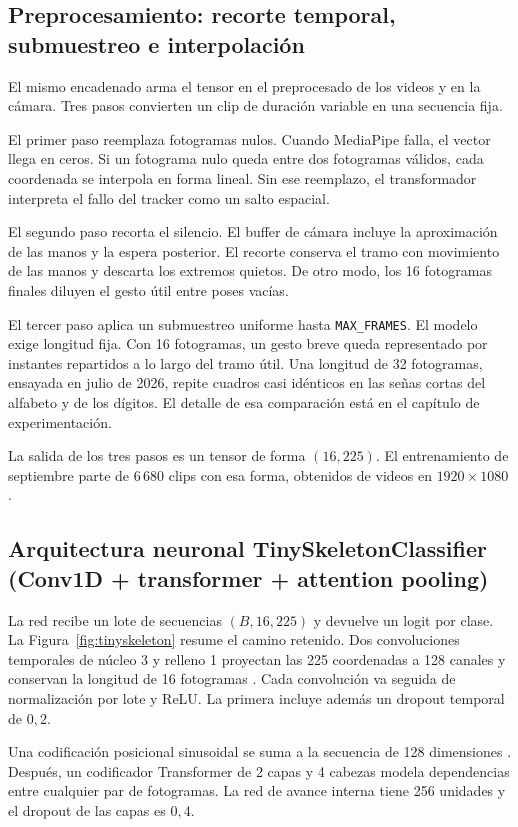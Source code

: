 \subsection{Preprocesamiento: recorte temporal, submuestreo e interpolación}

El mismo encadenado arma el tensor en el preprocesado de los videos y en la cámara. Tres pasos convierten un clip de duración variable en una secuencia fija.

El primer paso reemplaza fotogramas nulos. Cuando MediaPipe falla, el vector llega en ceros. Si un fotograma nulo queda entre dos fotogramas válidos, cada coordenada se interpola en forma lineal. Sin ese reemplazo, el transformador interpreta el fallo del tracker como un salto espacial.

El segundo paso recorta el silencio. El buffer de cámara incluye la aproximación de las manos y la espera posterior. El recorte conserva el tramo con movimiento de las manos y descarta los extremos quietos. De otro modo, los 16 fotogramas finales diluyen el gesto útil entre poses vacías.

El tercer paso aplica un submuestreo uniforme hasta \texttt{MAX\_FRAMES}. El modelo exige longitud fija. Con 16 fotogramas, un gesto breve queda representado por instantes repartidos a lo largo del tramo útil. Una longitud de 32 fotogramas, ensayada en julio de 2026, repite cuadros casi idénticos en las señas cortas del alfabeto y de los dígitos. El detalle de esa comparación está en el capítulo de experimentación.

La salida de los tres pasos es un tensor de forma $(16, 225)$. El entrenamiento de septiembre parte de 6\,680 clips con esa forma, obtenidos de videos en $1920 \times 1080$.

\subsection{Arquitectura neuronal TinySkeletonClassifier (Conv1D + transformer + attention pooling)}

La red recibe un lote de secuencias $(B, 16, 225)$ y devuelve un logit por clase. La Figura~\ref{fig:tinyskeleton} resume el camino retenido. Dos convoluciones temporales de núcleo 3 y relleno 1 proyectan las 225 coordenadas a 128 canales y conservan la longitud de 16 fotogramas \parencite{wu2020lite}. Cada convolución va seguida de normalización por lote y ReLU. La primera incluye además un dropout temporal de $0{,}2$.

Una codificación posicional sinusoidal se suma a la secuencia de 128 dimensiones \parencite{vaswani2017attention}. Después, un codificador Transformer de 2 capas y 4 cabezas modela dependencias entre cualquier par de fotogramas. La red de avance interna tiene 256 unidades y el dropout de las capas es $0{,}4$.


